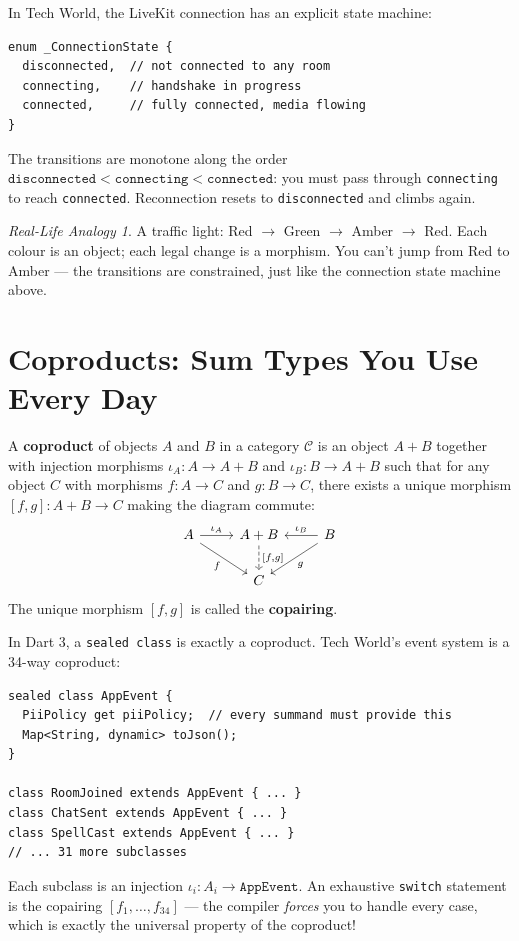 \documentclass[12pt,a4paper]{article}
\theoremstyle{definition}
\theoremstyle{plain}
\theoremstyle{remark}
\newtheorem*{reallife}{Real-Life Analogy}
\begin{document}
In Tech World, the LiveKit connection has an explicit state machine:

\begin{lstlisting}
enum _ConnectionState {
  disconnected,  // not connected to any room
  connecting,    // handshake in progress
  connected,     // fully connected, media flowing
}
\end{lstlisting}

The transitions are monotone along the order
$\texttt{disconnected} < \texttt{connecting} < \texttt{connected}$:
you must pass through \texttt{connecting} to reach \texttt{connected}.
Reconnection resets to \texttt{disconnected} and climbs again.

\begin{reallife}
A traffic light: Red $\to$ Green $\to$ Amber $\to$ Red.
Each colour is an object; each legal change is a morphism.
You can't jump from Red to Amber --- the transitions are constrained,
just like the connection state machine above.
\end{reallife}


\section{Coproducts: Sum Types You Use Every Day}
\label{sec:coproducts}

\begin{formal}
A \textbf{coproduct} of objects $A$ and $B$ in a category $\mathcal{C}$ is
an object $A + B$ together with injection morphisms
$\iota_A \colon A \to A + B$ and $\iota_B \colon B \to A + B$
such that for any object $C$ with morphisms $f \colon A \to C$ and
$g \colon B \to C$, there exists a unique morphism
$[f, g] \colon A + B \to C$ making the diagram commute:
\[
\begin{tikzcd}
A \arrow[r, "\iota_A"] \arrow[dr, "f"'] & A + B \arrow[d, dashed, "{[f,g]}"] & B \arrow[l, "\iota_B"'] \arrow[dl, "g"] \\
& C &
\end{tikzcd}
\]
The unique morphism $[f,g]$ is called the \textbf{copairing}.
\end{formal}

\begin{youknow}
In Dart 3, a \texttt{sealed class} is exactly a coproduct.
Tech World's event system is a 34-way coproduct:
\begin{lstlisting}
sealed class AppEvent {
  PiiPolicy get piiPolicy;  // every summand must provide this
  Map<String, dynamic> toJson();
}

class RoomJoined extends AppEvent { ... }
class ChatSent extends AppEvent { ... }
class SpellCast extends AppEvent { ... }
// ... 31 more subclasses
\end{lstlisting}
Each subclass is an injection $\iota_i \colon A_i \to \texttt{AppEvent}$.
An exhaustive \texttt{switch} statement is the copairing $[f_1, \ldots, f_{34}]$
--- the compiler \emph{forces} you to handle every case, which is exactly the
universal property of the coproduct!
\end{youknow}
\end{document}
